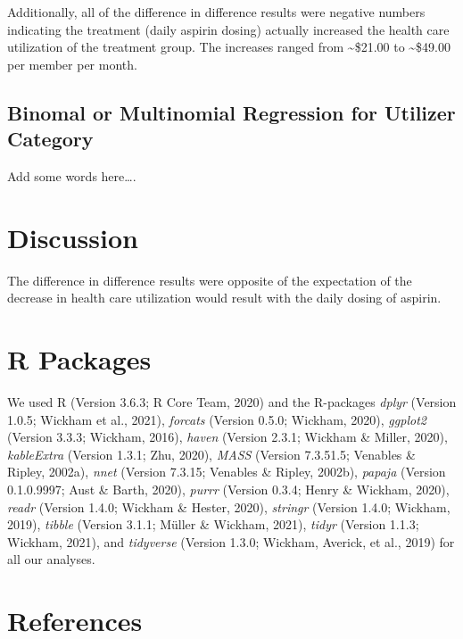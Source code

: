 \documentclass[
  english,
  man]{apa6}
\begin{document}
Additionally, all of the difference in difference results were negative numbers indicating the treatment (daily aspirin dosing) actually increased the health care utilization of the treatment group. The increases ranged from \textasciitilde\$21.00 to \textasciitilde\$49.00 per member per month.

\hypertarget{binomal-or-multinomial-regression-for-utilizer-category-1}{%
\subsection{Binomal or Multinomial Regression for Utilizer Category}\label{binomal-or-multinomial-regression-for-utilizer-category-1}}

Add some words here\ldots.

\hypertarget{discussion}{%
\section{Discussion}\label{discussion}}

The difference in difference results were opposite of the expectation of the decrease in health care utilization would result with the daily dosing of aspirin.

\newpage

\hypertarget{r-packages}{%
\section{R Packages}\label{r-packages}}

We used R (Version 3.6.3; R Core Team, 2020) and the R-packages \emph{dplyr} (Version 1.0.5; Wickham et al., 2021), \emph{forcats} (Version 0.5.0; Wickham, 2020), \emph{ggplot2} (Version 3.3.3; Wickham, 2016), \emph{haven} (Version 2.3.1; Wickham \& Miller, 2020), \emph{kableExtra} (Version 1.3.1; Zhu, 2020), \emph{MASS} (Version 7.3.51.5; Venables \& Ripley, 2002a), \emph{nnet} (Version 7.3.15; Venables \& Ripley, 2002b), \emph{papaja} (Version 0.1.0.9997; Aust \& Barth, 2020), \emph{purrr} (Version 0.3.4; Henry \& Wickham, 2020), \emph{readr} (Version 1.4.0; Wickham \& Hester, 2020), \emph{stringr} (Version 1.4.0; Wickham, 2019), \emph{tibble} (Version 3.1.1; Müller \& Wickham, 2021), \emph{tidyr} (Version 1.1.3; Wickham, 2021), and \emph{tidyverse} (Version 1.3.0; Wickham, Averick, et al., 2019) for all our analyses.

\hypertarget{references}{%
\section{References}\label{references}}
\end{document}
